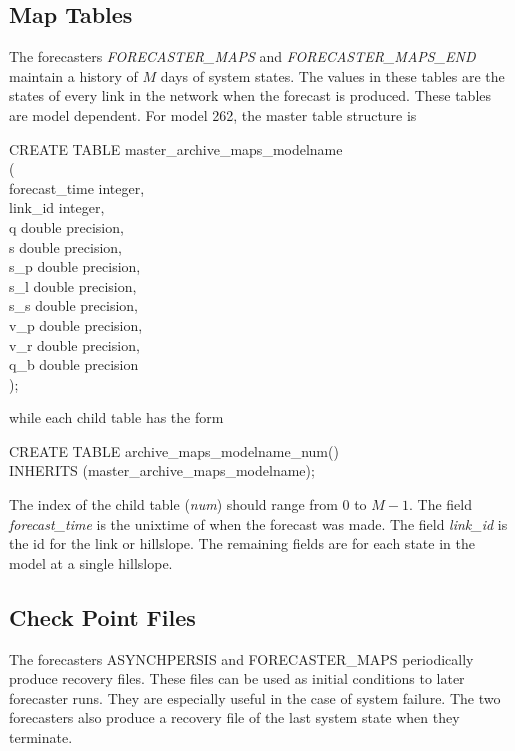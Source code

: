 \documentclass[12pt]{article}
\newenvironment{codeindent}
{\begin{list}{}
        {\setlength{\leftmargin}{.1in}}
        \item[]
}
{\end{list}}
\begin{document}
\subsection{Map Tables} \label{sec: map tables}

The forecasters \emph{FORECASTER\_MAPS} and \emph{FORECASTER\_MAPS\_END} maintain a history of $M$ days of system states. The values in these tables are the states of every link in the network when the forecast is produced. These tables are model dependent. For model 262, the master table structure is
\begin{codeindent}
CREATE TABLE master\_archive\_maps\_modelname \\
( \\
  forecast\_time integer, \\
  link\_id integer, \\
  q double precision, \\
  s double precision, \\
  s\_p double precision, \\
  s\_l double precision, \\
  s\_s double precision, \\
  v\_p double precision, \\
  v\_r double precision, \\
  q\_b double precision \\
);
\end{codeindent}
while each child table has the form
\begin{codeindent}
CREATE TABLE archive\_maps\_modelname\_num() \\
INHERITS (master\_archive\_maps\_modelname);
\end{codeindent}
The index of the child table (\emph{num}) should range from $0$ to $M-1$. The field \emph{forecast\_time} is the unixtime of when the forecast was made. The field \emph{link\_id} is the id for the link or hillslope. The remaining fields are for each state in the model at a single hillslope.

\subsection{Check Point Files} \label{sec: check point files}

The forecasters ASYNCHPERSIS and FORECASTER\_MAPS periodically produce recovery files. These files can be used as initial conditions to later forecaster runs. They are especially useful in the case of system failure. The two forecasters also produce a recovery file of the last system state when they terminate.
\end{document}
